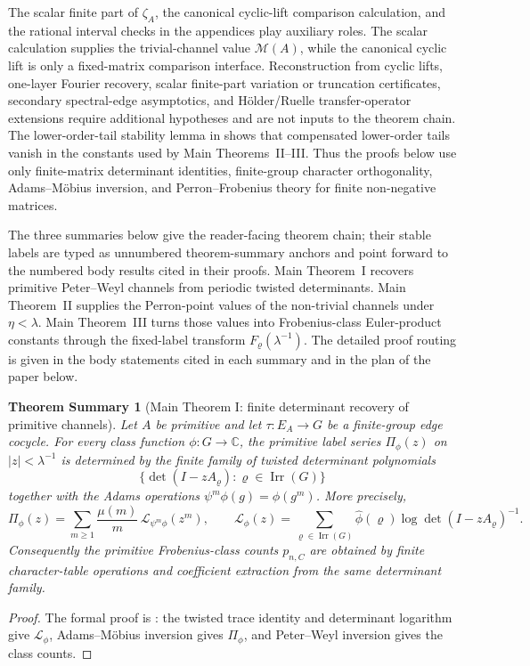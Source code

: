 \documentclass[11pt,a4paper]{amsart}
\theoremstyle{plain}
\newtheorem*{theoremsummary}{Theorem Summary}
\newcounter{theoremsummaryref}
\newcommand{\summaryrefstep}{\refstepcounter{theoremsummaryref}}
\theoremstyle{definition}
\theoremstyle{remark}
\DeclareMathOperator{\Irr}{Irr}
\newcommand{\CC}{\mathbb{C}}
\begin{document}
The scalar finite part of \(\zeta_A\), the canonical cyclic-lift comparison
calculation, and the rational interval checks in the appendices play
auxiliary roles.  The scalar calculation supplies the trivial-channel value
\(\mathcal M(A)\), while the canonical cyclic lift is only a fixed-matrix
comparison interface.  Reconstruction from cyclic lifts, one-layer Fourier
recovery, scalar finite-part variation or truncation certificates, secondary
spectral-edge asymptotics, and H\"older/Ruelle transfer-operator extensions
require additional hypotheses and are not inputs to the theorem chain.  The
lower-order-tail stability lemma in
   shows that compensated
  lower-order tails vanish in the constants used by Main Theorems~II--III. Thus
  the proofs below use only finite-matrix determinant identities, finite-group
  character orthogonality, Adams--M\"obius inversion, and Perron--Frobenius
  theory for finite non-negative matrices.

The three summaries below give the reader-facing theorem chain; their stable
labels are typed as unnumbered theorem-summary anchors and point forward to
the numbered body results cited in their proofs.  Main
Theorem~I recovers primitive Peter--Weyl channels from periodic twisted
determinants.  Main Theorem~II supplies the Perron-point values of the
non-trivial channels under \(\eta<\lambda\).  Main Theorem~III turns those
values into Frobenius-class Euler-product constants through the fixed-label
transform \(F_\varrho(\lambda^{-1})\).  The detailed proof routing is given in
the body statements cited in each summary and in the plan of the paper below.

\begin{theoremsummary}[Main Theorem I: finite determinant recovery of primitive channels]
  \summaryrefstep\label{stmt:main-theorem-i-adams-mobius-linearisation}
  \label{stmt:intro-adams-mobius-linearisation}
  \label{stmt:intro-finite-group}
  \label{stmt:intro-adams-mobius}
  Let \(A\) be primitive and let \(\tau:E_A\to G\) be a finite-group edge
  cocycle.  For every class function \(\phi:G\to\CC\), the primitive
  label series \(\Pi_\phi(z)\) on \(|z|<\lambda^{-1}\) is determined by
  the finite family of twisted determinant polynomials
  \[
    \{\det(I-zA_\varrho):\varrho\in\Irr(G)\}
  \]
  together with the Adams operations \(\psi^m\phi(g)=\phi(g^m)\).  More
  precisely,
  \[
    \Pi_\phi(z)=
    \sum_{m\ge1}\frac{\mu(m)}{m}\,
      \mathcal L_{\psi^m\phi}(z^m),
    \qquad
    \mathcal L_\phi(z)=
    \sum_{\varrho\in\Irr(G)}\widehat\phi(\varrho)
      \log\det(I-zA_\varrho)^{-1}.
  \]
  Consequently the primitive Frobenius-class counts \(p_{n,C}\) are
  obtained by finite character-table operations and coefficient
  extraction from the same determinant family.
\end{theoremsummary}
\begin{proof}
  The formal proof is : the twisted trace
  identity and determinant logarithm give \(\mathcal L_\phi\), Adams--M\"obius
  inversion gives \(\Pi_\phi\), and Peter--Weyl inversion gives the class counts.
\end{proof}
\end{document}
